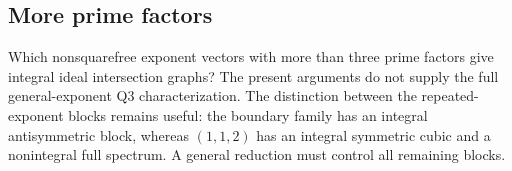 \subsection{More prime factors}

Which nonsquarefree exponent vectors with more than three prime factors
give integral ideal intersection graphs? The present arguments do not
supply the full general-exponent Q3 characterization. The distinction
between the repeated-exponent blocks remains useful: the boundary family
has an integral antisymmetric block, whereas $(1,1,2)$ has an integral
symmetric cubic and a nonintegral full spectrum. A general reduction must
control all remaining blocks.
